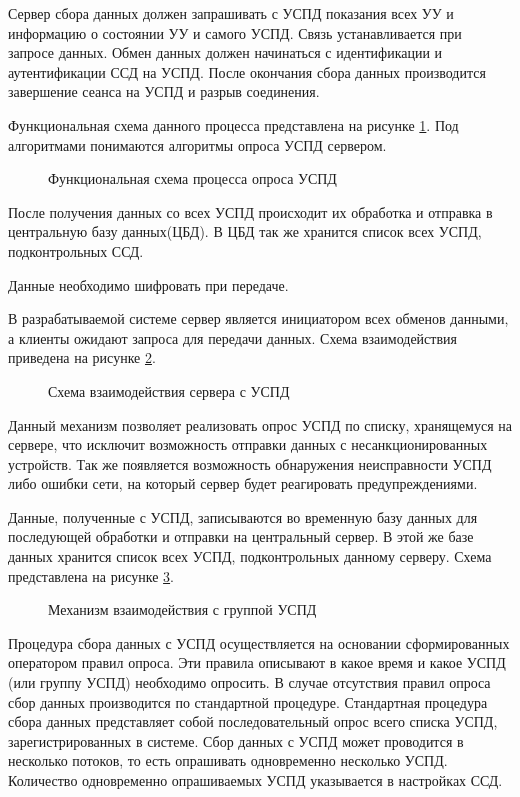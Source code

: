 Сервер сбора данных должен запрашивать с УСПД показания всех УУ и информацию о состоянии УУ и самого УСПД. Связь устанавливается при запросе данных. Обмен данных должен начинаться с идентификации и аутентификации ССД на УСПД. После окончания сбора данных производится завершение сеанса на УСПД и разрыв соединения.

Функциональная схема данного процесса представлена на рисунке \ref{img:main_idef0}. Под алгоритмами понимаются алгоритмы опроса УСПД сервером.

\begin{figure}[!h]
 \caption{Функциональная схема процесса опроса УСПД}
 \label{img:main_idef0}
\end{figure}

\newpage
После получения данных со всех УСПД происходит их обработка и отправка в центральную базу данных(ЦБД). В ЦБД так же хранится список всех УСПД, подконтрольных ССД.

Данные необходимо шифровать при передаче.

В разрабатываемой системе сервер является инициатором всех обменов данными, а клиенты ожидают запроса для передачи данных. Схема взаимодействия приведена на рисунке \ref{scheme2:scheme2}.

\begin{figure}[!ht]
 \caption{Схема взаимодействия сервера с УСПД}
 \label{scheme2:scheme2}
\end{figure}

\newpage
Данный механизм позволяет реализовать опрос УСПД по списку, хранящемуся на сервере, что исключит возможность отправки данных с несанкционированных устройств. Так же появляется возможность обнаружения неисправности УСПД либо ошибки сети, на который сервер будет реагировать предупреждениями. 

Данные, полученные с УСПД, записываются во временную базу данных для последующей обработки и отправки на центральный сервер. В этой же базе данных хранится список всех УСПД, подконтрольных данному серверу. Схема представлена на рисунке \ref{scheme3:scheme3}.

\begin{figure}[!ht]
 \caption{Механизм взаимодействия с группой УСПД}
 \label{scheme3:scheme3}
\end{figure}

\newpage
Процедура сбора данных с УСПД осуществляется на основании сформированных оператором правил опроса. Эти правила описывают в какое время и какое УСПД (или группу УСПД) необходимо опросить. В случае отсутствия правил опроса сбор данных производится по стандартной процедуре. Стандартная процедура сбора данных представляет собой последовательный опрос всего списка УСПД, зарегистрированных в системе. Сбор данных с УСПД может проводится в несколько потоков, то есть опрашивать одновременно несколько УСПД. Количество одновременно опрашиваемых УСПД указывается в настройках ССД.

